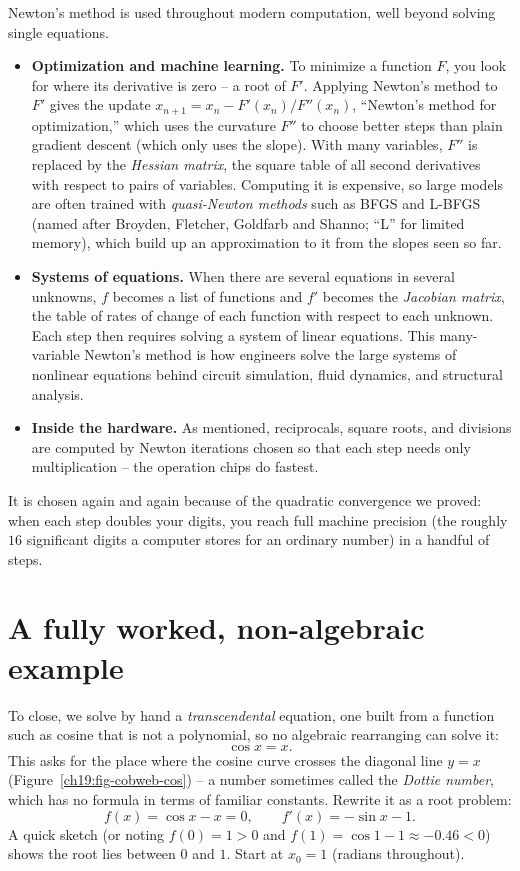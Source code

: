 \begin{applicationbox}
Newton's method is used throughout modern computation, well beyond solving
single equations.
\begin{itemize}
\item \textbf{Optimization and machine learning.} To minimize a function $F$, you
  look for where its derivative is zero -- a root of $F'$. Applying Newton's method
  to $F'$ gives the update $x_{n+1} = x_n - F'(x_n)/F''(x_n)$, ``Newton's method for
  optimization,'' which uses the curvature $F''$ to choose better steps than plain
  gradient descent (which only uses the slope). With many variables, $F''$ is
  replaced by the \emph{Hessian matrix}, the square table of all second derivatives
  with respect to pairs of variables. Computing it is expensive, so large models
  are often trained with \emph{quasi-Newton methods} such as BFGS and L-BFGS (named
  after Broyden, Fletcher, Goldfarb and Shanno; ``L'' for limited memory), which
  build up an approximation to it from the slopes seen so far.
\item \textbf{Systems of equations.} When there are several equations in several
  unknowns, $f$ becomes a list of functions and $f'$ becomes the \emph{Jacobian
  matrix}, the table of rates of change of each function with respect to each
  unknown. Each step then requires solving a system of linear equations. This
  many-variable Newton's method is how engineers solve the large systems of
  nonlinear equations behind circuit simulation, fluid dynamics, and structural
  analysis.
\item \textbf{Inside the hardware.} As mentioned, reciprocals, square roots, and
  divisions are computed by Newton iterations chosen so that each step needs only
  multiplication -- the operation chips do fastest.
\end{itemize}
It is chosen again and again because of the quadratic convergence we proved: when
each step doubles your digits, you reach full machine precision (the roughly $16$
significant digits a computer stores for an ordinary number) in a handful of steps.
\end{applicationbox}

\section{A fully worked, non-algebraic example}
\label{ch19:full-example}

To close, we solve by hand a \emph{transcendental} equation, one built from a
function such as cosine that is not a polynomial, so no algebraic rearranging
can solve it:
\[
  \cos x = x.
\]
This asks for the place where the cosine curve crosses the diagonal line $y = x$
(Figure~\ref{ch19:fig-cobweb-cos}) -- a number sometimes called the \emph{Dottie
number}, which has no formula in terms of familiar constants. Rewrite it
as a root problem:
\[
  f(x) = \cos x - x = 0, \qquad f'(x) = -\sin x - 1.
\]
A quick sketch (or noting $f(0) = 1 > 0$ and $f(1) = \cos 1 - 1 \approx -0.46 < 0$)
shows the root lies between $0$ and $1$. Start at $x_0 = 1$ (radians throughout).

